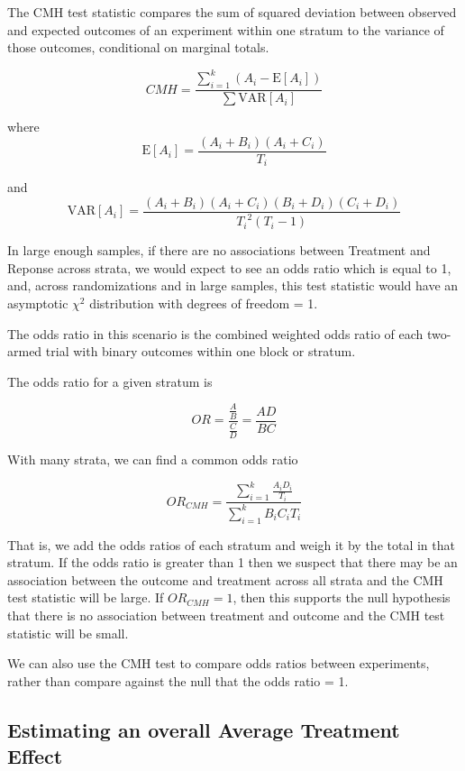 \documentclass[
  12pt,
]{book}
\theoremstyle{definition}
\theoremstyle{definition}
\theoremstyle{definition}
\theoremstyle{remark}
\begin{document}
The CMH test statistic compares the sum of squared deviation between
observed and expected outcomes of an experiment within one stratum to
the variance of those outcomes, conditional on marginal totals.

\[CMH = \frac{\sum_{i=1}^{k} (A_{i} -
\mathrm{E}[{A_{i}}])}{\sum{\mathrm{VAR}[{A_i}]}}\]

where \[\mathrm{E}[A_{i}] =  \frac{(A_i+B_i)(A_i+C_i)}{T_i}\]

and \[\mathrm{VAR}[A_{i}] =
\frac{(A_i+B_i)(A_i+C_i)(B_i+D_i)(C_i+D_i)}{{T_i}^2(T_i-1)}\]

In large enough samples, if there are no associations between Treatment
and Reponse across strata, we would expect to see an odds ratio which is
equal to 1, and, across randomizations and in large samples, this test
statistic would have an asymptotic \(\chi^2\) distribution with degrees
of freedom = 1.

The odds ratio in this scenario is the combined weighted odds ratio of
each two-armed trial with binary outcomes within one block or stratum.

The odds ratio for a given stratum is

\[ OR = \frac{\frac{A}{B}}{\frac{C}{D}} = \frac{AD}{BC}\]

With many strata, we can find a common odds ratio

\begin{equation}
 OR_{CMH} = \frac{\sum_{i=1}^{k} \frac{A_{i}D_{i}}{T_{i}}}{\sum_{i=1}^{k}{B_{i}C_{i}}{T_{i}}}
\end{equation}

That is, we add the odds ratios of each stratum and weigh it by the
total in that stratum. If the odds ratio is greater than 1 then we
suspect that there may be an association between the outcome and
treatment across all strata and the CMH test statistic will be large. If
\(OR_{CMH} = 1\), then this supports the null hypothesis that there is
no association between treatment and outcome and the CMH test statistic
will be small.

We can also use the CMH test to compare odds ratios between experiments,
rather than compare against the null that the odds ratio = 1.

\hypertarget{blockrandate}{%
\subsection{Estimating an overall Average Treatment
Effect}\label{blockrandate}}
\end{document}
